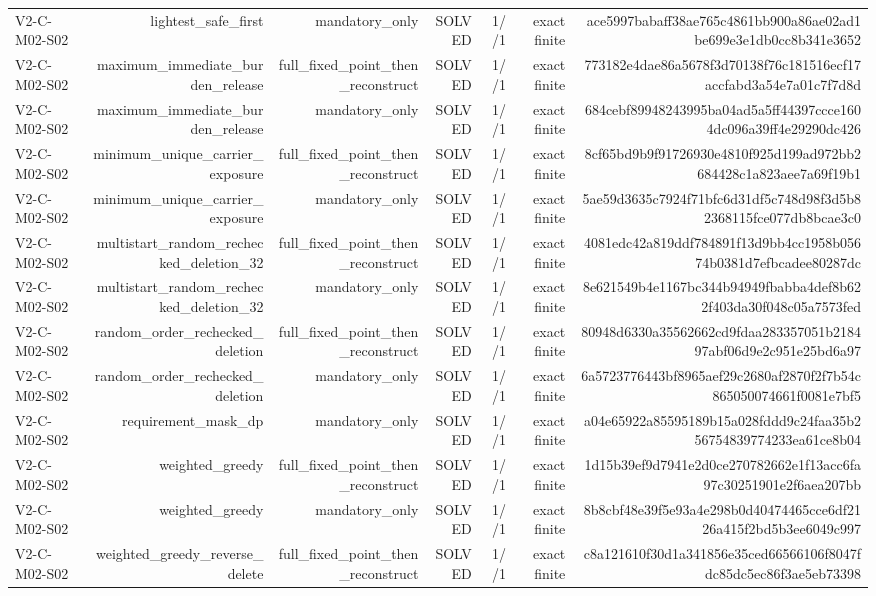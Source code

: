 {\begin{longtable}{lrrrrrr}
V2-C-M02-S02 & lightest\_safe\_first & mandatory\_only & SOLVED & 1//1 & exact finite & ace5997babaff38ae765c4861bb900a86ae02ad1be699e3e1db0cc8b341e3652 \\
V2-C-M02-S02 & maximum\_immediate\_burden\_release & full\_fixed\_point\_then\_reconstruct & SOLVED & 1//1 & exact finite & 773182e4dae86a5678f3d70138f76c181516ecf17accfabd3a54e7a01c7f7d8d \\
V2-C-M02-S02 & maximum\_immediate\_burden\_release & mandatory\_only & SOLVED & 1//1 & exact finite & 684cebf89948243995ba04ad5a5ff44397ccce1604dc096a39ff4e29290dc426 \\
V2-C-M02-S02 & minimum\_unique\_carrier\_exposure & full\_fixed\_point\_then\_reconstruct & SOLVED & 1//1 & exact finite & 8cf65bd9b9f91726930e4810f925d199ad972bb2684428c1a823aee7a69f19b1 \\
V2-C-M02-S02 & minimum\_unique\_carrier\_exposure & mandatory\_only & SOLVED & 1//1 & exact finite & 5ae59d3635c7924f71bfc6d31df5c748d98f3d5b82368115fce077db8bcae3c0 \\
V2-C-M02-S02 & multistart\_random\_rechecked\_deletion\_32 & full\_fixed\_point\_then\_reconstruct & SOLVED & 1//1 & exact finite & 4081edc42a819ddf784891f13d9bb4cc1958b05674b0381d7efbcadee80287dc \\
V2-C-M02-S02 & multistart\_random\_rechecked\_deletion\_32 & mandatory\_only & SOLVED & 1//1 & exact finite & 8e621549b4e1167bc344b94949fbabba4def8b622f403da30f048c05a7573fed \\
V2-C-M02-S02 & random\_order\_rechecked\_deletion & full\_fixed\_point\_then\_reconstruct & SOLVED & 1//1 & exact finite & 80948d6330a35562662cd9fdaa283357051b218497abf06d9e2c951e25bd6a97 \\
V2-C-M02-S02 & random\_order\_rechecked\_deletion & mandatory\_only & SOLVED & 1//1 & exact finite & 6a5723776443bf8965aef29c2680af2870f2f7b54c865050074661f0081e7bf5 \\
V2-C-M02-S02 & requirement\_mask\_dp & mandatory\_only & SOLVED & 1//1 & exact finite & a04e65922a85595189b15a028fddd9c24faa35b256754839774233ea61ce8b04 \\
V2-C-M02-S02 & weighted\_greedy & full\_fixed\_point\_then\_reconstruct & SOLVED & 1//1 & exact finite & 1d15b39ef9d7941e2d0ce270782662e1f13acc6fa97c30251901e2f6aea207bb \\
V2-C-M02-S02 & weighted\_greedy & mandatory\_only & SOLVED & 1//1 & exact finite & 8b8cbf48e39f5e93a4e298b0d40474465cce6df2126a415f2bd5b3ee6049c997 \\
V2-C-M02-S02 & weighted\_greedy\_reverse\_delete & full\_fixed\_point\_then\_reconstruct & SOLVED & 1//1 & exact finite & c8a121610f30d1a341856e35ced66566106f8047fdc85dc5ec86f3ae5eb73398 \\

\end{longtable}}
